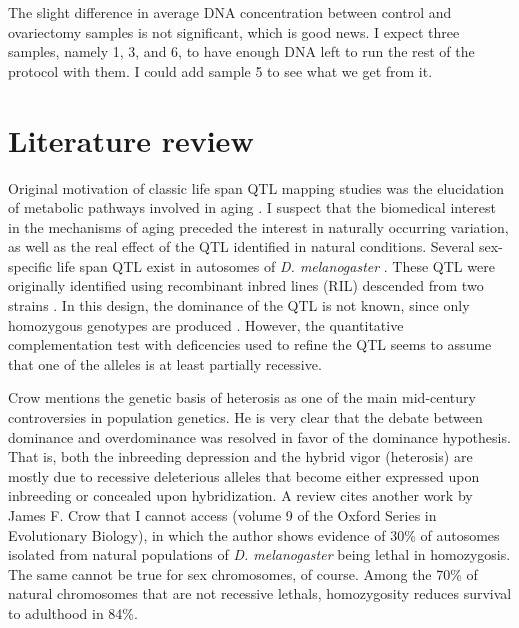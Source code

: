 \documentclass[a4paper,12pt]{article}
\begin{document}
The slight difference in average DNA concentration between control and ovariectomy samples is not significant, which is good news. I expect three samples, namely 1, 3, and 6, to have enough DNA left to run the rest of the protocol with them. I could add sample 5 to see what we get from it.

\section{Literature review}
Original motivation of classic life span QTL mapping studies was the elucidation of metabolic pathways involved in aging \cite{Nuzhdin2005}. I suspect that the biomedical interest in the mechanisms of aging preceded the interest in naturally occurring variation, as well as the real effect of the QTL identified in natural conditions. Several sex-specific life span QTL exist in autosomes of \emph{D. melanogaster} \cite{Nuzhdin1997,Pasyukova2000}. These QTL were originally identified using recombinant inbred lines (RIL) descended from two strains \cite{Nuzhdin1997}. In this design, the dominance of the QTL is not known, since only homozygous genotypes are produced \cite[][page 432]{Lynch1998}. However, the quantitative complementation test with deficencies used to refine the QTL \cite{Pasyukova2000} seems to assume that one of the alleles is at least partially recessive.

Crow \cite{Crow2008} mentions the genetic basis of heterosis as one of the main mid-century controversies in population genetics. He is very clear that the debate between dominance and overdominance was resolved in favor of the dominance hypothesis. That is, both the inbreeding depression and the hybrid vigor (heterosis) are mostly due to recessive deleterious alleles that become either expressed upon inbreeding or concealed upon hybridization. A review \cite{Charlesworth2009} cites another work by James F. Crow that I cannot access (volume 9 of the Oxford Series in Evolutionary Biology), in which the author shows evidence of 30\% of autosomes isolated from natural populations of \emph{D. melanogaster} being lethal in homozygosis. The same cannot be true for sex chromosomes, of course. Among the 70\% of natural chromosomes that are not recessive lethals, homozygosity reduces survival to adulthood in 84\%.
\end{document}
